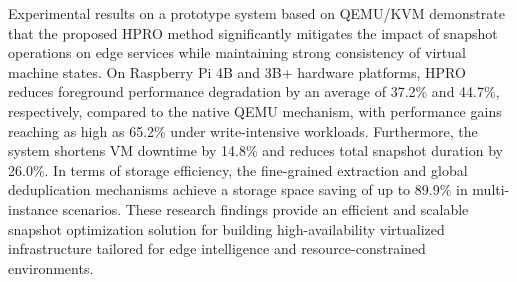 \begin{eabstract}
Experimental results on a prototype system based on QEMU/KVM demonstrate that the proposed HPRO method significantly mitigates the impact of snapshot operations on edge services while maintaining strong consistency of virtual machine states. On Raspberry Pi 4B and 3B+ hardware platforms, HPRO reduces foreground performance degradation by an average of 37.2\% and 44.7\%, respectively, compared to the native QEMU mechanism, with performance gains reaching as high as 65.2\% under write-intensive workloads. Furthermore, the system shortens VM downtime by 14.8\% and reduces total snapshot duration by 26.0\%. In terms of storage efficiency, the fine-grained extraction and global deduplication mechanisms achieve a storage space saving of up to 89.9\% in multi-instance scenarios. These research findings provide an efficient and scalable snapshot optimization solution for building high-availability virtualized infrastructure tailored for edge intelligence and resource-constrained environments.
\end{eabstract}

